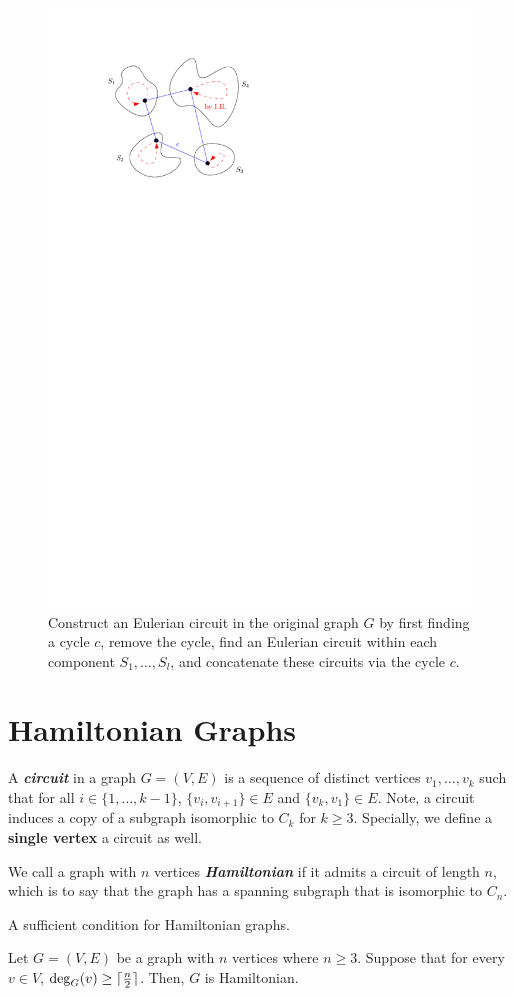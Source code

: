 \begin{figure}[htbp]
    \centering
    \includegraphics[width=0.3\linewidth]{figures/eulerian-circuit-construct.pdf}
    \caption{Construct an Eulerian circuit in the original graph $G$ by first finding a cycle $c$, remove the cycle, find an Eulerian circuit within each component $S_1,\ldots,S_l$, and concatenate these circuits via the cycle $c$.}
    \label{fig:euler-circuit-construct}
\end{figure}

\section{Hamiltonian Graphs}

\begin{definition}[Circuits]
    A \textit{\textbf{circuit}} in a graph $G = (V,E)$ is a sequence of distinct vertices $v_1,\ldots,v_k$ such that for all $i \in \{1,\ldots, k-1\}$, $\{v_i,v_{i+1}\} \in E$ and $\{v_k,v_1\} \in E$. Note, a circuit induces a copy of a subgraph isomorphic to $C_k$ for $k \geq 3$. Specially, we define a \textbf{single vertex} a circuit as well.
\end{definition}

\begin{definition}
    We call a graph with $n$ vertices \textit{\textbf{Hamiltonian}} if it admits a circuit of length $n$, which is to say that the graph has a spanning subgraph that is isomorphic to $C_n$.
\end{definition}

A sufficient condition for Hamiltonian graphs.

\begin{theorem}[Dirac, 1952]
    Let $G = (V,E)$ be a graph with $n$ vertices where $n \geq 3$. Suppose that for every $v \in V$, $\deg_G(v) \geq \lceil\frac{n}{2}\rceil$. Then, $G$ is Hamiltonian.
\end{theorem}

